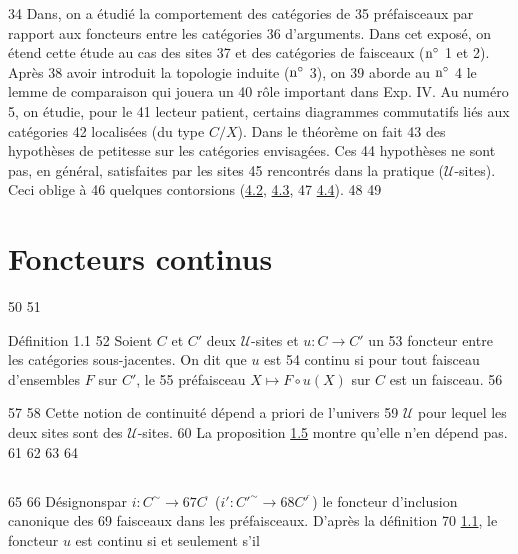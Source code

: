     34	Dans\pageoriginale {}, on a étudié la comportement des catégories de
    35	préfaisceaux par rapport aux foncteurs entre les catégories
    36	d'arguments. Dans cet exposé, on étend cette étude au cas des sites
    37	et des catégories de faisceaux (${\rm n^{\circ}}$ 1 et 2). Après
    38	avoir introduit la topologie induite (${\rm n^{\circ}}$ 3), on
    39	aborde au ${\rm n^{\circ}}$ 4 le lemme de comparaison qui jouera un
    40	rôle important dans Exp. IV. Au numéro 5, on étudie, pour le
    41	lecteur patient, certains diagrammes commutatifs liés aux catégories
    42	localisées (du type $C/X$). Dans le théorème  on fait
    43	des hypothèses de petitesse sur les catégories envisagées. Ces
    44	hypothèses ne sont pas, en général, satisfaites par les sites
    45	rencontrés dans la pratique ($𝒰$-sites). Ceci oblige à
    46	quelques contorsions (\hyperref[III.subsec4.2]{4.2}, \hyperref[III.subsec4.3]{4.3},
    47	\hyperref[III.subsec4.4]{4.4}).
    48	
    49	\section{Foncteurs continus}
    50	
    51	\begin{enonce*}{Définition 1.1}
    52	Soient $C$ et $C'$ deux $𝒰$-sites et $u:C\rightarrow C'$ un
    53	foncteur entre les catégories sous-jacentes. On dit que $u$ est
    54	continu si pour tout faisceau d'ensembles $F$ sur $C'$, le
    55	préfaisceau $X\mapsto F\circ u(X)$ sur $C$ est un faisceau.
    56	\end{enonce*}
    57	
    58	Cette notion de continuité dépend a priori de l'univers
    59	$𝒰$ pour lequel les deux sites sont des $𝒰$-sites.
    60	La proposition \hyperref[III.prop1.5]{1.5} montre qu'elle n'en dépend pas.
    61	
    62	%
    63	\setcounter{subsection}{10}
    64	\subsection{}
    65	%
    66	Désignons\pageoriginale par $i:C^{\sim}\rightarrow
    67	C^{\widehat{\phantom{,}}}$ (\resp $i':{C'}^{\sim}\rightarrow
    68	{C'}^{\widehat{\phantom{,}}}$) le foncteur d'inclusion canonique des
    69	faisceaux dans les préfaisceaux. D'après la définition
    70	\hyperref[III.def1.1]{1.1}, le foncteur $u$ est continu si et seulement s'il
